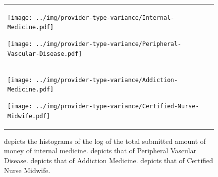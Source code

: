 \documentclass[dvipdfmx, english]{ampmt}             %
\begin{document}
\begin{figure}[H]
	\begin{tabular}{ll}
	\begin{minipage}{.5\hsize}
	\centering
	\centerline{\texttt{[image: ../img/provider-type-variance/Internal-Medicine.pdf]}}
	\subcaption{}\label{fig:internal}
	\end{minipage} 
      \begin{minipage}{.5\hsize}
        \centering
        \centerline{\texttt{[image: ../img/provider-type-variance/Peripheral-Vascular-Disease.pdf]}}
        	\subcaption{}\label{fig:peripheral}
      \end{minipage} \\
       \begin{minipage}{.5\hsize}
        \centering
        \centerline{\texttt{[image: ../img/provider-type-variance/Addiction-Medicine.pdf]}}
        \subcaption{}\label{fig:addiction}
      \end{minipage} 
       \begin{minipage}{.5\hsize}
        \centering
        \centerline{\texttt{[image: ../img/provider-type-variance/Certified-Nurse-Midwife.pdf]}}
        \subcaption{}\label{fig:nurse}
      \end{minipage} \\
    \end{tabular}
    \caption{ depicts the histograms of the log of the total submitted amount of money of internal medicine.  depicts that of Peripheral Vascular Disease.  depicts that of Addiction Medicine.  depicts that of Certified Nurse Midwife.}
    \label{fig:type-vari-his}
\end{figure}



\end{document}
